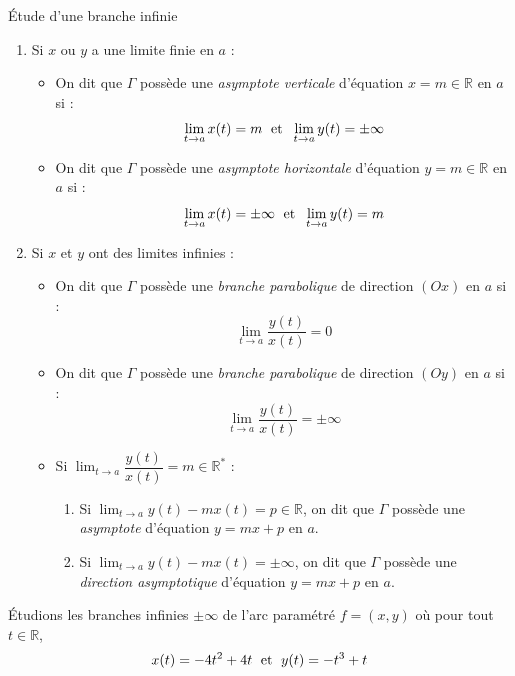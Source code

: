 \documentclass[french,11pt,twoside]{VcCours}
\begin{document}
\begin{Methode}{Étude d'une branche infinie}
 \begin{enumerate}
 \item Si $x$ ou $y$ a une limite finie en $a$ :
 \begin{itemize}
 \item On dit que $\Gamma$ possède une \emph{asymptote verticale} d'équation $x=m \in \mathbb{R}$ en $a$ si :
 $$ \lim_{t \rightarrow a} x(t)=m \; \hbox{ et } \; \lim_{t \rightarrow a} y(t) =\pm  \infty $$
  \item On dit que $\Gamma$ possède une \emph{asymptote horizontale} d'équation $y=m \in \mathbb{R}$ en $a$ si :
 $$ \lim_{t \rightarrow a} x(t)=\pm \infty \; \hbox{ et } \; \lim_{t \rightarrow a} y(t) = m$$
 \end{itemize}
 \item Si $x$ et $y$ ont des limites infinies :
 \begin{itemize}
 \item On dit que $\Gamma$ possède une \emph{branche parabolique} de direction $(Ox)$ en $a$ si :
 $$ \lim_{t \rightarrow a} \dfrac{y(t)}{x(t)} = 0$$
 \item  On dit que $\Gamma$ possède une \emph{branche parabolique} de direction $(Oy)$ en $a$ si :
 $$ \lim_{t \rightarrow a} \dfrac{y(t)}{x(t)} = \pm \infty$$
 \item Si $\lim_{t \rightarrow a} \dfrac{y(t)}{x(t)} = m \in \mathbb{R}^*$ :
 \begin{enumerate}
 \item Si $\lim_{t \rightarrow a} y(t)-mx(t) = p \in \mathbb{R}$, on dit que $\Gamma$ possède une \emph{asymptote} d'équation $y=mx+p$ en $a$.
  \item Si $\lim_{t \rightarrow a} y(t)-mx(t) = \pm \infty$, on dit que $\Gamma$ possède une \emph{direction asymptotique} d'équation $y=mx+p$ en $a$.
 \end{enumerate}
 \end{itemize}
 \end{enumerate}
\end{Methode}

\begin{Exemple} Étudions les branches infinies $\pm \infty$ de l'arc paramétré $f=(x,y)$ où pour tout $t \in \mathbb{R}$,
$$ x(t) = -4t^2+4t \; \hbox{ et } \; y(t)=-t^3+t$$

\newpage
\vspace*{5cm}
\end{Exemple}
\end{document}
